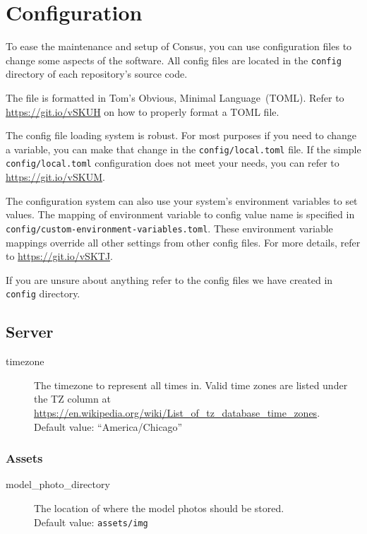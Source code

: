 \section{Configuration}
\label{sec:config}

To ease the maintenance and setup of Consus, you can use configuration files to change some aspects of the software.
All config files are located in the \texttt{config} directory of each repository's source code.

The file is formatted in Tom's Obvious, Minimal Language~(TOML).
Refer to \url{https://git.io/vSKUH} on how to properly format a TOML file.

The config file loading system is robust.
For most purposes if you need to change a variable, you can make that change in the \texttt{config/local.toml} file.
If the simple \texttt{config/local.toml} configuration does not meet your needs, you can refer to \url{https://git.io/vSKUM}.

The configuration system can also use your system's environment variables to set values.
The mapping of environment variable to config value name is specified in \texttt{config/custom-environment-variables.toml}.
These environment variable mappings override all other settings from other config files.
For more details, refer to \url{https://git.io/vSKTJ}.

If you are unsure about anything refer to the config files we have created in \texttt{config} directory.

\subsection{Server}
\label{subsec:server_config}

\begin{description}
  \item[timezone] The timezone to represent all times in.
    Valid time zones are listed under the TZ column at \url{https://en.wikipedia.org/wiki/List_of_tz_database_time_zones}.\\
    Default value: ``America/Chicago''
\end{description}

\subsubsection{Assets}
\label{subsubsec:server_config_assets}

\begin{description}
  \item[model\_photo\_directory] The location of where the model photos should be stored.\\
    Default value: \texttt{assets/img}
\end{description}

